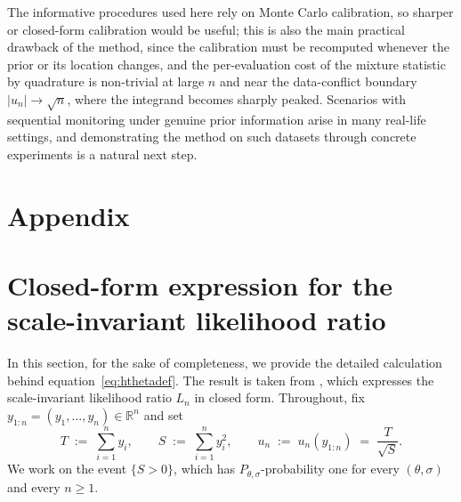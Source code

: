 \documentclass[12pt, a4paper]{report}
\newcommand{\1}{\mathbf{1}}
\begin{document}
The informative procedures used here rely on Monte Carlo calibration, so sharper or closed-form calibration would be useful; this is also
the main practical drawback of the method, since the calibration must be
recomputed whenever the prior or its location changes, and the per-evaluation cost of the mixture statistic by quadrature is non-trivial at large $n$ and near the data-conflict boundary $|u_n| \to \sqrt{n}$, where the integrand becomes sharply peaked. Scenarios with sequential monitoring under genuine prior information arise in
many real-life settings, and demonstrating the method on such datasets through concrete experiments is a natural next step.




\clearpage
\appendix
\section*{Appendix}
\section{Closed-form expression for the scale-invariant likelihood ratio}\label{app:a}
In this section, for the sake of completeness, we provide the detailed calculation behind equation~\eqref{eq:hthetadef}. The result is taken from \cite{Wang2025}, which expresses the scale-invariant likelihood ratio $L_n$ in closed form. Throughout, fix $y_{1:n}=(y_1,\dots,y_n)\in\mathbb{R}^n$ and set
\[
  T \;:=\; \sum_{i=1}^{n}y_i,
  \qquad
  S \;:=\; \sum_{i=1}^{n}y_i^{2},
  \qquad
  u_n \;:=\; u_n(y_{1:n}) \;=\; \frac{T}{\sqrt{S}}.
\]
We work on the event $\{S>0\}$, which has $P_{\theta,\sigma}$-probability
one for every $(\theta,\sigma)$ and every $n\geq 1$.
\end{document}
